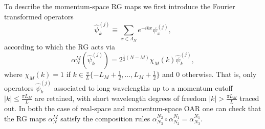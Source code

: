 \documentclass[12pt]{article}
\newcommand{\1}{\mathds{1}}
\begin{document}
To describe the momentum-space RG maps we first introduce the Fourier transformed operators
\begin{equation}
	\widehat{\psi}_k^{(j)} \equiv \sum_{x\in\Lambda_N} e^{-ikx}\psi_x^{(j)},
\end{equation}
according to which the RG acts via
\begin{equation}
	\alpha_N^M(\widehat{\psi}_k^{(j)}) = 2^{\frac12(N-M)} \chi_M(k) \widehat{\psi}_k^{(j)},
\end{equation}
where $\chi_M(k) = 1$ if $k\in \frac{\pi}{L}\{-L_{M}+\frac12, \ldots, L_{M}+\frac12\}$ and $0$ otherwise. That is, only  operators $\widehat{\psi}_k^{(j)}$ associated to long wavelengths up to a momentum cutoff $|k| \le \frac{\pi L_{M}}{L}$ are retained, with short wavelength degrees of freedom $|k|>\frac{\pi L_{M}}{L}$ traced out. In both the case of real-space and momentum-space OAR one can check that the RG maps $\alpha_N^M$ satisfy the composition rules $\alpha^{N_{2}}_{N_{3}}\circ\alpha^{N_{1}}_{N_{2}}\!=\!\alpha^{N_{1}}_{N_{3}}$.
\end{document}
